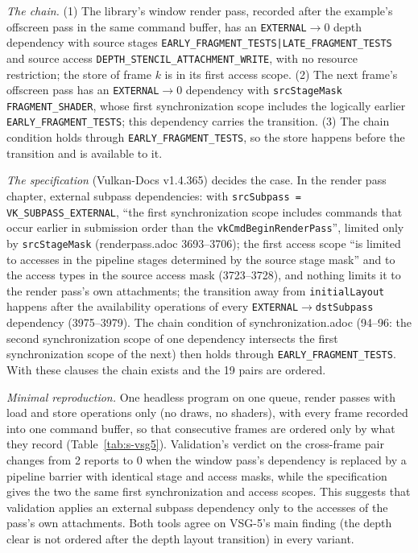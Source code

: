 \documentclass[acmtog,anonymous,review]{acmart}
\newcommand{\code}[1]{\texttt{#1}}
\begin{document}
\emph{The chain.} (1) The library's window render pass, recorded after the example's offscreen pass in the same command
buffer, has an \code{EXTERNAL}$\to$0 depth dependency with source stages
\code{EARLY\_FRAGMENT\_TESTS|LATE\_FRAGMENT\_TESTS} and source access \code{DEPTH\_STENCIL\_ATTACHMENT\_WRITE}, with no
resource restriction; the store of frame $k$ is in its first access scope. (2) The next frame's offscreen pass has an
\code{EXTERNAL}$\to$0 dependency with \code{srcStageMask FRAGMENT\_SHADER}, whose first synchronization scope includes
the logically earlier \code{EARLY\_FRAGMENT\_TESTS}; this dependency carries the transition. (3) The chain condition
holds through \code{EARLY\_FRAGMENT\_TESTS}, so the store happens before the transition and is available to it.

\emph{The specification} (Vulkan-Docs v1.4.365) decides the case. In the render pass chapter, external
subpass dependencies: with \code{srcSubpass = VK\_SUBPASS\_EXTERNAL}, ``the first synchronization scope includes
commands that occur earlier in submission order than the \code{vkCmdBeginRenderPass}'', limited only by
\code{srcStageMask} (renderpass.adoc 3693--3706); the first access scope ``is limited to accesses in the pipeline stages
determined by the source stage mask'' and to the access types in the source access mask (3723--3728), and nothing
limits it to the render pass's own attachments; the transition away from \code{initialLayout} happens after the
availability operations of every \code{EXTERNAL}$\to$\code{dstSubpass} dependency (3975--3979). The chain condition of
synchronization.adoc (94--96: the second synchronization scope of one dependency intersects the first synchronization
scope of the next) then holds through \code{EARLY\_FRAGMENT\_TESTS}. With these clauses the chain exists and the 19 pairs
are ordered.

\emph{Minimal reproduction.} One headless program on one queue, render passes with load and store operations only (no
draws, no shaders), with every frame recorded into one command buffer, so that consecutive frames are ordered only by
what they record (Table~\ref{tab:s-vsg5}). Validation's verdict on the cross-frame pair changes from 2 reports to 0
when the window pass's dependency is replaced by a pipeline barrier with identical stage and access masks, while the
specification gives the two the same first synchronization and access scopes. This suggests that validation applies an
external subpass dependency only to the accesses of the pass's own attachments. Both tools agree on VSG-5's main finding
(the depth clear is not ordered after the depth layout transition) in every variant.
\end{document}
